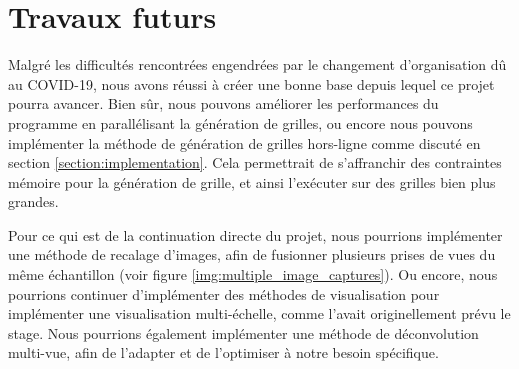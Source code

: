 {	\section{Travaux futurs}
	{
		Malgré les difficultés rencontrées engendrées par le changement d'organisation dû au COVID-19, nous avons réussi à créer une bonne base depuis lequel ce projet pourra avancer. Bien sûr, nous pouvons améliorer les performances du programme en parallélisant la génération de grilles, ou encore nous pouvons implémenter la méthode de génération de grilles hors-ligne comme discuté en section \ref{section:implementation}. Cela permettrait de s'affranchir des contraintes mémoire pour la génération de grille, et ainsi l'exécuter sur des grilles bien plus grandes.

		Pour ce qui est de la continuation directe du projet, nous pourrions implémenter une méthode de recalage d'images, afin de fusionner plusieurs prises de vues du même échantillon (voir figure \ref{img:multiple_image_captures}). Ou encore, nous pourrions continuer d'implémenter des méthodes de visualisation pour implémenter une visualisation multi-échelle, comme l'avait originellement prévu le stage. Nous pourrions également implémenter une méthode de déconvolution multi-vue, afin de l'adapter et de l'optimiser à notre besoin spécifique.
	}
	
}


